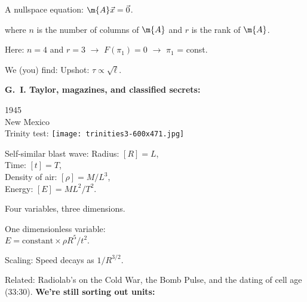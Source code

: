       A nullspace equation: $ \m{A} \vec{x} = \vec{0}$.
    
      where $n$ is the number of columns of $\m{A}$ and $r$ is the rank
      of $\m{A}$.
    
      Here: $n=4$ and $r=3$ 
      {$\rightarrow$ $F(\pi_1) = 0$}
      {$\rightarrow$ $\pi_1$ = const.}
    
    
      We (you) find:
      {
        Upshot: $\tau \propto \sqrt{\ell}$.
      }
    
  \small


  \textbf{G.\ I. Taylor, magazines, and classified secrets:}
      
      1945 \\  New Mexico \\ Trinity test:
      \texttt{[image: trinities3-600x471.jpg]}
      
      Self-similar blast wave:
        Radius: $[R] = L$, \\
        Time: $[t] = T$,\\
        Density of air: $[\rho]=M/L^{3}$,\\
        Energy: $[E] = ML^{2}/T^{2}$.
       
        Four variables, three dimensions.
       
        One dimensionless variable:\\
        $
        E
        = 
        \mbox{constant} \times
        \rho R^5 / t^2.
        $
       
        Scaling: Speed decays as $1/R^{3/2}$.
  

  {Related: Radiolab's 
  on the Cold War, the Bomb Pulse, and the dating of cell age (33:30).}
  \textbf{We're still sorting out units:}

